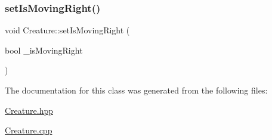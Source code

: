 \mbox{\label{class_creature_a7b222797d42b668ebf2a02eef51feaf8}} 
\subsubsection{\texorpdfstring{set\+Is\+Moving\+Right()}{setIsMovingRight()}}
{\footnotesize\ttfamily void Creature\+::set\+Is\+Moving\+Right (\begin{DoxyParamCaption}\item[{bool}]{\+\_\+is\+Moving\+Right }\end{DoxyParamCaption})}



The documentation for this class was generated from the following files\+:\begin{DoxyCompactItemize}
\item 
\mbox{\hyperlink{_creature_8hpp}{Creature.\+hpp}}\item 
\mbox{\hyperlink{_creature_8cpp}{Creature.\+cpp}}\end{DoxyCompactItemize}

